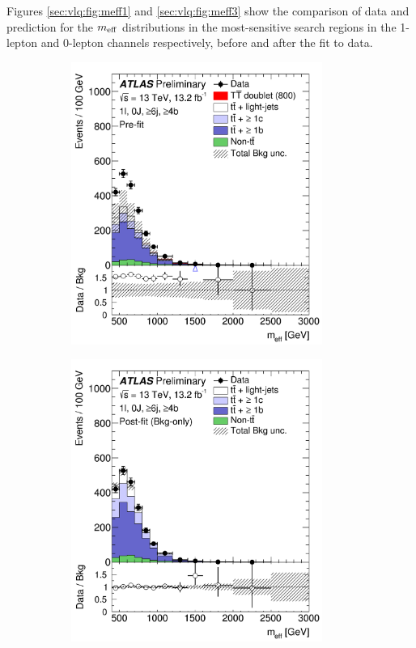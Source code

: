 Figures \ref{sec:vlq:fig:meff1} and \ref{sec:vlq:fig:meff3}  show the comparison of data and prediction for the $m_{\rm eff}$ distributions in the most-sensitive search regions in the 1-lepton and 0-lepton channels respectively, before and after the fit to data. 


\begin{figure}[p!]
\begin{subfigure}{0.24\textwidth}
  \centering
  \includegraphics[width=0.9\textwidth]{figures/VLQ/fig_10a.png}
  \caption{}
  \label{}
\end{subfigure}
\begin{subfigure}{0.24\textwidth}
  \centering
  \includegraphics[width=0.9\textwidth]{figures/VLQ/fig_10b.png}

\end{subfigure}
\end{figure}
